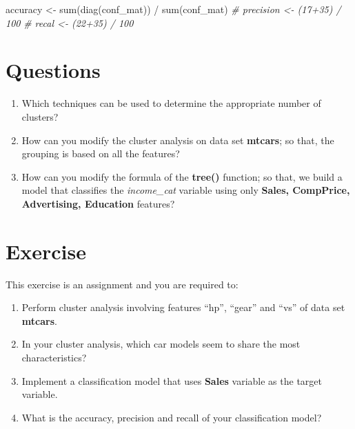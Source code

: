 \documentclass[
]{article}
\newenvironment{Shaded}{\begin{snugshade}}{\end{snugshade}}
\newcommand{\CommentTok}[1]{\textcolor[rgb]{0.56,0.35,0.01}{\textit{#1}}}
\newcommand{\FunctionTok}[1]{\textcolor[rgb]{0.00,0.00,0.00}{#1}}
\newcommand{\NormalTok}[1]{#1}
\newcommand{\OtherTok}[1]{\textcolor[rgb]{0.56,0.35,0.01}{#1}}
\newcommand{\SpecialCharTok}[1]{\textcolor[rgb]{0.00,0.00,0.00}{#1}}
\providecommand{\tightlist}{%
  \setlength{\itemsep}{0pt}\setlength{\parskip}{0pt}}
\begin{document}
\begin{Shaded}
\begin{Highlighting}[]
\NormalTok{accuracy }\OtherTok{\textless{}{-}} \FunctionTok{sum}\NormalTok{(}\FunctionTok{diag}\NormalTok{(conf\_mat)) }\SpecialCharTok{/} \FunctionTok{sum}\NormalTok{(conf\_mat)}
\CommentTok{\# precision \textless{}{-} (17+35) / 100}
\CommentTok{\# recal \textless{}{-} (22+35) / 100}
\end{Highlighting}
\end{Shaded}

\hypertarget{questions}{%
\section{Questions}\label{questions}}

\begin{enumerate}
\def\labelenumi{\arabic{enumi}.}
\tightlist
\item
  Which techniques can be used to determine the appropriate number of
  clusters?
\item
  How can you modify the cluster analysis on data set \textbf{mtcars};
  so that, the grouping is based on all the features?
\item
  How can you modify the formula of the \textbf{tree()} function; so
  that, we build a model that classifies the \emph{income\_cat} variable
  using only \textbf{Sales, CompPrice, Advertising, Education} features?
\end{enumerate}

\hypertarget{exercise}{%
\section{Exercise}\label{exercise}}

This exercise is an assignment and you are required to:

\begin{enumerate}
\def\labelenumi{\alph{enumi}.}
\tightlist
\item
  Perform cluster analysis involving features ``hp'', ``gear'' and
  ``vs'' of data set \textbf{mtcars}.
\item
  In your cluster analysis, which car models seem to share the most
  characteristics?
\item
  Implement a classification model that uses \textbf{Sales} variable as
  the target variable.
\item
  What is the accuracy, precision and recall of your classification
  model?
\end{enumerate}
\end{document}
